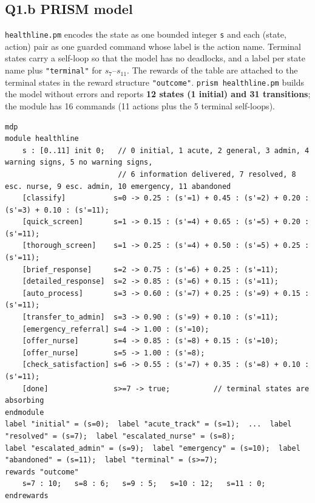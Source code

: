\documentclass[10pt,a4paper]{article}
\newcommand{\code}[1]{\texttt{#1}}
\begin{document}
\subsection{Q1.b PRISM model}
\code{healthline.pm} encodes the state as one bounded integer \code{s} and each (state, action) pair as one guarded command whose label is the action name. Terminal states carry a self-loop so that the model has no deadlocks, and a label per state name plus \code{"terminal"} for $s_7$--$s_{11}$. The rewards of the table are attached to the terminal states in the reward structure \code{"outcome"}. \code{prism healthline.pm} builds the model without errors and reports \textbf{12 states (1 initial) and 31 transitions}; the module has 16 commands (11 actions plus the 5 terminal self-loops).
\begin{lstlisting}
mdp
module healthline
    s : [0..11] init 0;   // 0 initial, 1 acute, 2 general, 3 admin, 4 warning signs, 5 no warning signs,
                          // 6 information delivered, 7 resolved, 8 esc. nurse, 9 esc. admin, 10 emergency, 11 abandoned
    [classify]           s=0 -> 0.25 : (s'=1) + 0.45 : (s'=2) + 0.20 : (s'=3) + 0.10 : (s'=11);
    [quick_screen]       s=1 -> 0.15 : (s'=4) + 0.65 : (s'=5) + 0.20 : (s'=11);
    [thorough_screen]    s=1 -> 0.25 : (s'=4) + 0.50 : (s'=5) + 0.25 : (s'=11);
    [brief_response]     s=2 -> 0.75 : (s'=6) + 0.25 : (s'=11);
    [detailed_response]  s=2 -> 0.85 : (s'=6) + 0.15 : (s'=11);
    [auto_process]       s=3 -> 0.60 : (s'=7) + 0.25 : (s'=9) + 0.15 : (s'=11);
    [transfer_to_admin]  s=3 -> 0.90 : (s'=9) + 0.10 : (s'=11);
    [emergency_referral] s=4 -> 1.00 : (s'=10);
    [offer_nurse]        s=4 -> 0.85 : (s'=8) + 0.15 : (s'=10);
    [offer_nurse]        s=5 -> 1.00 : (s'=8);
    [check_satisfaction] s=6 -> 0.55 : (s'=7) + 0.35 : (s'=8) + 0.10 : (s'=11);
    [done]               s>=7 -> true;          // terminal states are absorbing
endmodule
label "initial" = (s=0);  label "acute_track" = (s=1);  ...  label "resolved" = (s=7);  label "escalated_nurse" = (s=8);
label "escalated_admin" = (s=9);  label "emergency" = (s=10);  label "abandoned" = (s=11);  label "terminal" = (s>=7);
rewards "outcome"
    s=7 : 10;   s=8 : 6;   s=9 : 5;   s=10 : 12;   s=11 : 0;
endrewards
\end{lstlisting}
\end{document}
